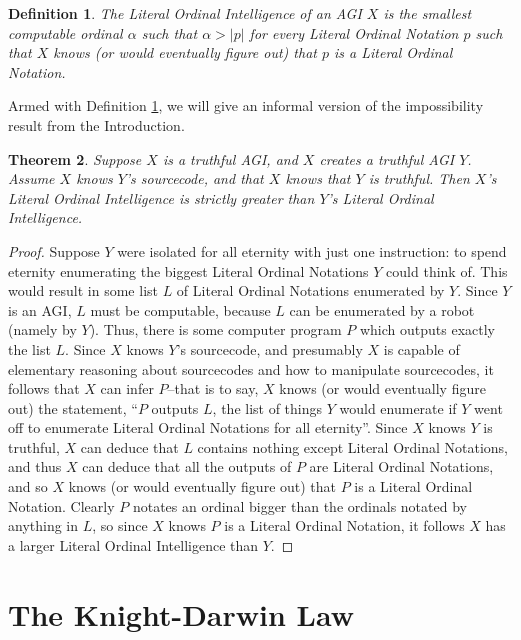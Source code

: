 \documentclass[runningheads]{llncs}
\newtheorem{mytheorem}{Theorem}
\newtheorem{mydefinition}[mytheorem]{Definition}
\begin{document}
\begin{mydefinition}
\label{maindefinition}
    The \emph{Literal Ordinal Intelligence} of an AGI $X$ is the smallest computable
    ordinal $\alpha$ such that $\alpha>|p|$ for every Literal Ordinal Notation
    $p$ such that $X$ knows (or would eventually figure out) that $p$ is a
    Literal Ordinal Notation.
\end{mydefinition}

Armed with Definition \ref{maindefinition}, we will give an informal version of the
impossibility result from the Introduction.

\begin{mytheorem}
\label{maintheorem}
    Suppose $X$ is a truthful AGI, and $X$ creates a truthful AGI $Y$.
    Assume $X$ knows $Y$'s sourcecode, and that $X$ knows that $Y$ is truthful.
    Then $X$'s Literal Ordinal Intelligence is strictly greater than $Y$'s
    Literal Ordinal Intelligence.
\end{mytheorem}

\begin{proof}
    Suppose $Y$ were isolated for all eternity with just one instruction:
    to spend eternity enumerating the biggest Literal Ordinal Notations $Y$ could
    think of. This would result in some list $L$ of Literal Ordinal Notations
    enumerated by $Y$. Since $Y$ is an AGI, $L$ must be computable, because $L$ can
    be enumerated by a robot (namely by $Y$). Thus, there is some computer program
    $P$ which outputs exactly the list $L$. Since $X$ knows $Y$'s sourcecode,
    and presumably $X$ is capable of elementary reasoning about sourcecodes and
    how to manipulate sourcecodes, it follows that $X$ can infer $P$--that is to
    say, $X$ knows (or would eventually figure out) the statement, ``$P$ outputs
    $L$, the list of things $Y$ would enumerate if $Y$ went off to enumerate
    Literal Ordinal Notations for all eternity''. Since $X$ knows $Y$ is truthful,
    $X$ can deduce that $L$ contains nothing except Literal Ordinal Notations,
    and thus $X$ can deduce that all the outputs of $P$ are Literal Ordinal Notations,
    and so $X$ knows (or would eventually figure out) that $P$ is a Literal Ordinal Notation.
    Clearly $P$ notates an ordinal bigger than the ordinals notated by anything in $L$,
    so since $X$ knows $P$ is a Literal Ordinal Notation, it follows $X$ has a larger
    Literal Ordinal Intelligence than $Y$.
\end{proof}

\section{The Knight-Darwin Law}
\label{kdlawsection}
\end{document}
